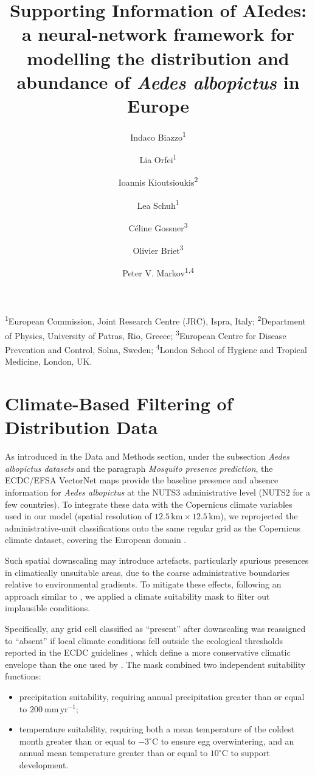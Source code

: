 \documentclass[11pt,a4paper]{article}
\title{Supporting Information of AIedes: a neural-network framework for modelling the distribution and abundance of \textit{Aedes albopictus} in Europe}
\author{%
Indaco Biazzo\textsuperscript{1} \and
Lia Orfei\textsuperscript{1} \and
Ioannis Kioutsioukis\textsuperscript{2} \and
Lea Schuh\textsuperscript{1} \and
Céline Gossner\textsuperscript{3} \and
Olivier Briet\textsuperscript{3} \and
Peter V. Markov\textsuperscript{1,4}
}
\date{} %
\begin{document}
\maketitle

{\fontsize{7pt}{8pt}\selectfont\linespread{0.8}\noindent
\textsuperscript{1}European Commission, Joint Research Centre (JRC), Ispra, Italy; 
\textsuperscript{2}Department of Physics, University of Patras, Rio, Greece; 
\textsuperscript{3}European Centre for Disease Prevention and Control, Solna, Sweden; 
\textsuperscript{4}London School of Hygiene and Tropical Medicine, London, UK.
}

\section{Climate-Based Filtering of Distribution Data}

As introduced in the Data and Methods section, under the subsection \textit{Aedes albopictus datasets} and the paragraph \textit{Mosquito presence prediction}, the ECDC/EFSA VectorNet maps \cite{ecdc2024b, Wint2023} provide the baseline presence and absence information for \emph{Aedes albopictus} at the NUTS3 administrative level (NUTS2 for a few countries). To integrate these data with the Copernicus climate variables used in our model (spatial resolution of $12.5\,\text{km} \times 12.5\,\text{km}$), we reprojected the administrative-unit classifications onto the same regular grid as the Copernicus climate dataset, covering the European domain \cite{biazzo2026_datasets}.

Such spatial downscaling may introduce artefacts, particularly spurious presences in climatically unsuitable areas, due to the coarse administrative boundaries relative to environmental gradients. To mitigate these effects, following an approach similar to \cite{zardini2024}, we applied a climate suitability mask to filter out implausible conditions.

Specifically, any grid cell classified as ``present'' after downscaling was reassigned to ``absent'' if local climate conditions fell outside the ecological thresholds reported in the ECDC guidelines \cite{ecdc2024a}, which define a more conservative climatic envelope than the one used by \cite{zardini2024}. The mask combined two independent suitability functions:
\begin{itemize}
    \item precipitation suitability, requiring annual precipitation greater than or equal to $200~\text{mm}\,\text{yr}^{-1}$;
    \item temperature suitability, requiring both a mean temperature of the coldest month greater than or equal to $-3^{\circ}\text{C}$ to ensure egg overwintering, and an annual mean temperature greater than or equal to $10^{\circ}\text{C}$ to support development.
\end{itemize}
\end{document}

